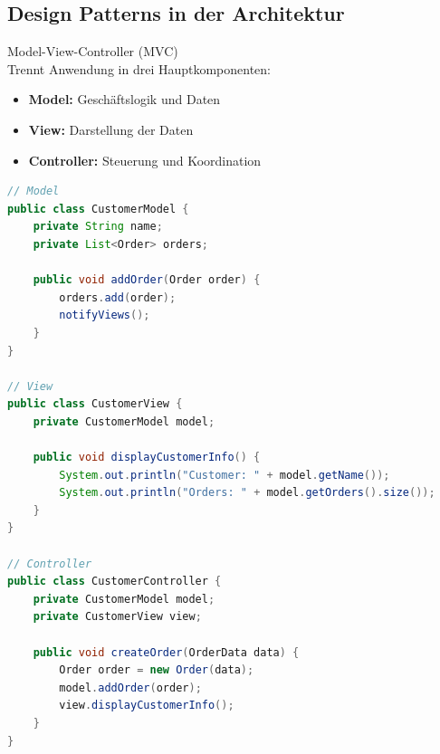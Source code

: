 \subsection{Design Patterns in der Architektur}

\begin{concept}{Model-View-Controller (MVC)}\\
Trennt Anwendung in drei Hauptkomponenten:
\begin{itemize}
    \item \textbf{Model:} Geschäftslogik und Daten
    \item \textbf{View:} Darstellung der Daten
    \item \textbf{Controller:} Steuerung und Koordination
\end{itemize}

\begin{lstlisting}[language=Java, style=basesmol]
// Model
public class CustomerModel {
    private String name;
    private List<Order> orders;
    
    public void addOrder(Order order) {
        orders.add(order);
        notifyViews();
    }
}

// View
public class CustomerView {
    private CustomerModel model;
    
    public void displayCustomerInfo() {
        System.out.println("Customer: " + model.getName());
        System.out.println("Orders: " + model.getOrders().size());
    }
}

// Controller
public class CustomerController {
    private CustomerModel model;
    private CustomerView view;
    
    public void createOrder(OrderData data) {
        Order order = new Order(data);
        model.addOrder(order);
        view.displayCustomerInfo();
    }
}
\end{lstlisting}
\end{concept}

